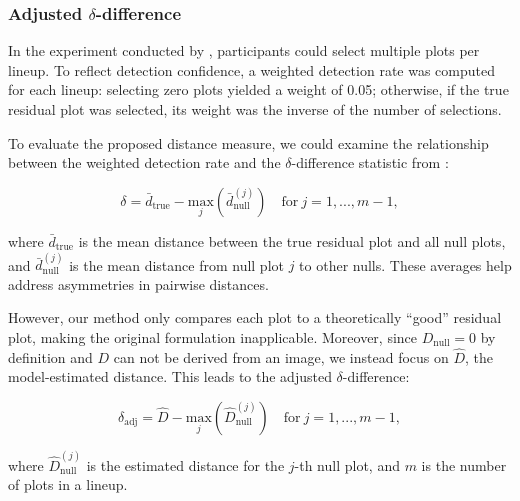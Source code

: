 \documentclass[]{interact}
\theoremstyle{plain}%
\theoremstyle{definition}
\theoremstyle{remark}
\begin{document}
\subsubsection{\texorpdfstring{Adjusted
\(\delta\)-difference}{Adjusted \textbackslash delta-difference}}\label{adjusted-delta-difference}

In the experiment conducted by \citet{li2024plot}, participants could
select multiple plots per lineup. To reflect detection confidence, a
weighted detection rate was computed for each lineup: selecting zero
plots yielded a weight of 0.05; otherwise, if the true residual plot was
selected, its weight was the inverse of the number of selections.

To evaluate the proposed distance measure, we could examine the
relationship between the weighted detection rate and the
\(\delta\)-difference statistic from \citet{chowdhury2018measuring}:

\[
\delta = \bar{d}_{\text{true}} - \underset{j}{\text{max}}\left(\bar{d}_{\text{null}}^{(j)}\right) \quad \text{for}~j = 1,...,m-1,
\]

\noindent where \(\bar{d}_{\text{true}}\) is the mean distance between
the true residual plot and all null plots, and
\(\bar{d}_{\text{null}}^{(j)}\) is the mean distance from null plot
\(j\) to other nulls. These averages help address asymmetries in
pairwise distances.

However, our method only compares each plot to a theoretically ``good''
residual plot, making the original formulation inapplicable. Moreover,
since \(D_{\text{null}} = 0\) by definition and \(D\) can not be derived
from an image, we instead focus on \(\hat{D}\), the model-estimated
distance. This leads to the adjusted \(\delta\)-difference:

\[
\delta_{\text{adj}} = \hat{D} - \underset{j}{\text{max}}\left(\hat{D}_{\text{null}}^{(j)}\right) \quad \text{for}~j = 1,...,m-1,
\]

\noindent where \(\hat{D}_{\text{null}}^{(j)}\) is the estimated
distance for the \(j\)-th null plot, and \(m\) is the number of plots in
a lineup.
\end{document}
